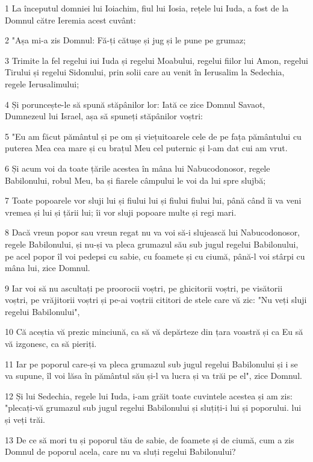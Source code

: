 \par 1 La începutul domniei lui Ioiachim, fiul lui Iosia, rețele lui Iuda, a fost de la Domnul către Ieremia acest cuvânt:
\par 2 "Așa mi-a zis Domnul: Fă-ți cătușe și jug și le pune pe grumaz;
\par 3 Trimite la fel regelui iui Iuda și regelui Moabului, regelui fiilor lui Amon, regelui Tirului și regelui Sidonului, prin solii care au venit în Ierusalim la Sedechia, regele Ierusalimului;
\par 4 Și poruncește-le să spună stăpânilor lor: Iată ce zice Domnul Savaot, Dumnezeul lui Israel, așa să spuneți stăpânilor voștri:
\par 5 "Eu am făcut pământul și pe om și viețuitoarele cele de pe fața pământului cu puterea Mea cea mare și cu brațul Meu cel puternic și l-am dat cui am vrut.
\par 6 Și acum voi da toate țările acestea în mâna lui Nabucodonosor, regele Babilonului, robul Meu, ba și fiarele câmpului le voi da lui spre slujbă;
\par 7 Toate popoarele vor sluji lui și fiului lui și fiului fiului lui, până când îi va veni vremea și lui și țării lui; îi vor sluji popoare multe și regi mari.
\par 8 Dacă vreun popor sau vreun regat nu va voi să-i slujească lui Nabucodonosor, regele Babilonului, și nu-și va pleca grumazul său sub jugul regelui Babilonului, pe acel popor îl voi pedepsi cu sabie, cu foamete și cu ciumă, până-l voi stârpi cu mâna lui, zice Domnul.
\par 9 Iar voi să nu ascultați pe proorocii voștri, pe ghicitorii voștri, pe visătorii voștri, pe vrăjitorii voștri și pe-ai voștrii cititori de stele care vă zic: "Nu veți sluji regelui Babilonului",
\par 10 Că aceștia vă prezic minciună, ca să vă depărteze din țara voastră și ca Eu să vă izgonesc, ca să pieriți.
\par 11 Iar pe poporul care-și va pleca grumazul sub jugul regelui Babilonului și i se va supune, îl voi lăsa în pământul său și-l va lucra și va trăi pe el", zice Domnul.
\par 12 Și lui Sedechia, regele lui Iuda, i-am grăit toate cuvintele acestea și am zis: "plecați-vă grumazul sub jugul regelui Babilonului și sluțiți-i lui și poporului. lui și veți trăi.
\par 13 De ce să mori tu și poporul tău de sabie, de foamete și de ciumă, cum a zis Domnul de poporul acela, care nu va sluți regelui Babilonului?
